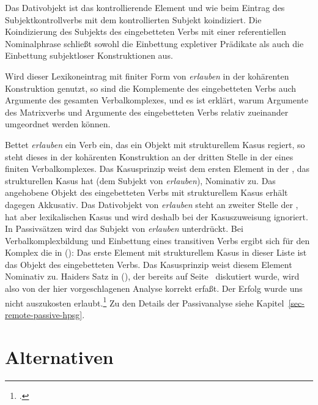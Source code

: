 {\noindent
Das Dativobjekt ist das kontrollierende Element und wie beim Eintrag des Subjektkontrollverbs
mit dem kontrollierten Subjekt koindiziert. Die Koindizierung des Subjekts des eingebetteten
Verbs mit einer referentiellen Nominalphrase schließt sowohl die Einbettung expletiver Prädikate
als auch die Einbettung subjektloser Konstruktionen aus.

Wird dieser Lexikoneintrag mit finiter Form von \emph{erlauben} in der kohärenten Konstruktion genutzt,
so sind die Komplemente des eingebetteten Verbs auch Argumente des gesamten Verbalkomplexes, und
es ist erklärt, warum Argumente des Matrixverbs und Argumente des eingebetteten Verbs
relativ zueinander umgeordnet werden können.

Bettet \emph{erlauben} ein Verb ein, das ein Objekt mit strukturellem Kasus regiert, so steht
dieses in der kohärenten Konstruktion an der dritten Stelle in der \compsl eines finiten
Verbalkomplexes. Das Kasusprinzip weist dem ersten Element in der \compsl, das strukturellen
Kasus hat (dem Subjekt von \emph{erlauben}), Nominativ zu. Das angehobene Objekt des eingebetteten Verbs
mit strukturellem Kasus erhält dagegen Akkusativ. Das Dativobjekt von \emph{erlauben} steht
an zweiter Stelle der \compsl, hat aber lexikalischen Kasus und wird deshalb bei der Kasuszuweisung ignoriert.
In Passivsätzen wird das Subjekt von \emph{erlauben} unterdrückt. Bei Verbalkomplexbildung
und Einbettung eines transitiven Verbs ergibt sich für den Komplex die \compsl in ():
\ea
\comps {}
\z
Das erste Element mit strukturellem Kasus in dieser Liste ist das Objekt des eingebetteten
Verbs. Das Kasusprinzip weist diesem Element Nominativ zu. Haiders Satz in (),
der bereits auf Seite~\pageref{erfolg-auszukosten-erlaubt-kasus} diskutiert wurde,
wird also von der hier vorgeschlagenen Analyse korrekt erfaßt.
\ea
{}
Der Erfolg        wurde uns      nicht auszukosten erlaubt.\footnote{
        .%
}
\z
Zu den Details der Passivanalyse siehe Kapitel~\ref{sec-remote-passive-hpsg}.
%
%

\section{Alternativen}

\begin{comment}
\subsection{Einbettung von Verbalphrasen oder Sätzen in AcI-Konstruktionen}


\end{comment}}
